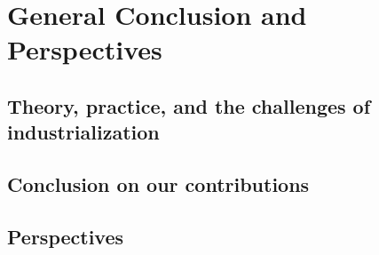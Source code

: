 
\chapter{General Conclusion and Perspectives}
\label{chapter:conclusion}

\section{Theory, practice, and the challenges of industrialization}
\section{Conclusion on our contributions}
\section{Perspectives}
